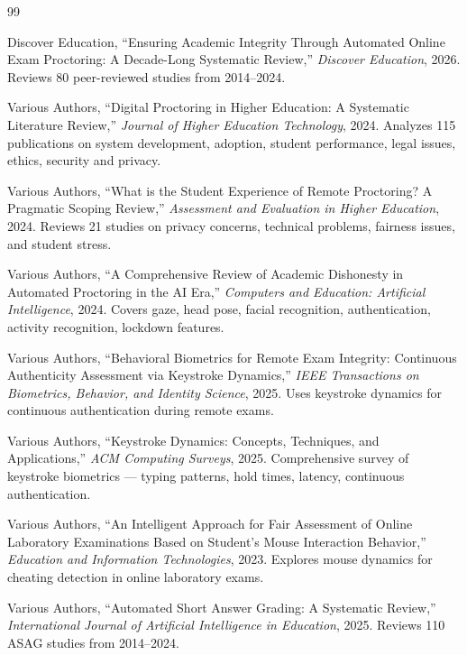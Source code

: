 \documentclass{article}
\begin{document}
\begin{thebibliography}{99}

Discover Education,
``Ensuring Academic Integrity Through Automated Online Exam Proctoring: A Decade-Long Systematic Review,''
\textit{Discover Education}, 2026.
Reviews 80 peer-reviewed studies from 2014--2024.

Various Authors,
``Digital Proctoring in Higher Education: A Systematic Literature Review,''
\textit{Journal of Higher Education Technology}, 2024.
Analyzes 115 publications on system development, adoption, student performance, legal issues, ethics, security and privacy.

Various Authors,
``What is the Student Experience of Remote Proctoring? A Pragmatic Scoping Review,''
\textit{Assessment and Evaluation in Higher Education}, 2024.
Reviews 21 studies on privacy concerns, technical problems, fairness issues, and student stress.

Various Authors,
``A Comprehensive Review of Academic Dishonesty in Automated Proctoring in the AI Era,''
\textit{Computers and Education: Artificial Intelligence}, 2024.
Covers gaze, head pose, facial recognition, authentication, activity recognition, lockdown features.

Various Authors,
``Behavioral Biometrics for Remote Exam Integrity: Continuous Authenticity Assessment via Keystroke Dynamics,''
\textit{IEEE Transactions on Biometrics, Behavior, and Identity Science}, 2025.
Uses keystroke dynamics for continuous authentication during remote exams.

Various Authors,
``Keystroke Dynamics: Concepts, Techniques, and Applications,''
\textit{ACM Computing Surveys}, 2025.
Comprehensive survey of keystroke biometrics --- typing patterns, hold times, latency, continuous authentication.

Various Authors,
``An Intelligent Approach for Fair Assessment of Online Laboratory Examinations Based on Student's Mouse Interaction Behavior,''
\textit{Education and Information Technologies}, 2023.
Explores mouse dynamics for cheating detection in online laboratory exams.

Various Authors,
``Automated Short Answer Grading: A Systematic Review,''
\textit{International Journal of Artificial Intelligence in Education}, 2025.
Reviews 110 ASAG studies from 2014--2024.


\end{thebibliography}
\end{document}
